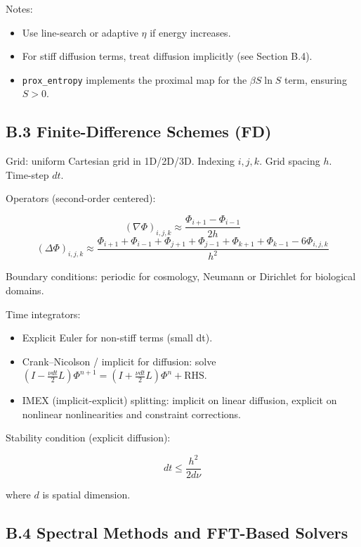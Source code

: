 \documentclass[11pt,a4paper]{article}
\begin{document}
Notes:

\begin{itemize}
  \item Use line-search or adaptive \(\eta\) if energy increases.
  \item For stiff diffusion terms, treat diffusion implicitly (see Section B.4).
  \item \texttt{prox\_entropy} implements the proximal map for the \(\beta S\ln S\) term, ensuring \(S>0\).
\end{itemize}

\subsection{B.3 Finite-Difference Schemes (FD)}

Grid: uniform Cartesian grid in 1D/2D/3D. Indexing \(i,j,k\). Grid spacing \(h\). Time-step \(dt\).

Operators (second-order centered):

\[
(\nabla \Phi)_{i,j,k} \approx \frac{\Phi_{i+1}-\Phi_{i-1}}{2h}
\]
\[
(\Delta \Phi)_{i,j,k} \approx \frac{\Phi_{i+1}+ \Phi_{i-1} + \Phi_{j+1} + \Phi_{j-1} + \Phi_{k+1} + \Phi_{k-1} - 6\Phi_{i,j,k}}{h^2}
\]

Boundary conditions: periodic for cosmology, Neumann or Dirichlet for biological domains.

Time integrators:

\begin{itemize}
  \item Explicit Euler for non-stiff terms (small dt).
  \item Crank–Nicolson / implicit for diffusion: solve \((I - \frac{\nu dt}{2} L)\Phi^{n+1} = (I + \frac{\nu dt}{2} L)\Phi^n + \text{RHS}\).
  \item IMEX (implicit-explicit) splitting: implicit on linear diffusion, explicit on nonlinear nonlinearities and constraint corrections.
\end{itemize}

Stability condition (explicit diffusion):

\[
dt \le \frac{h^2}{2d \nu}
\]

where \(d\) is spatial dimension.

\subsection{B.4 Spectral Methods and FFT-Based Solvers}
\end{document}
